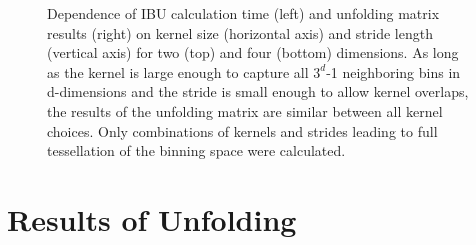    \begin{figure}[ht]
        \centering
    
    
        \caption[Kernel and Stride Dependence of IBU]{Dependence of IBU calculation time (left) and unfolding matrix results (right) on kernel size (horizontal axis) and stride length (vertical axis) for two (top) and four (bottom) dimensions. As long as the kernel is large enough to capture all $3^d$-1 neighboring bins in d-dimensions and the stride is small enough to allow kernel overlaps, the results of the unfolding matrix are similar between all kernel choices. Only combinations of kernels and strides leading to full tessellation of the binning space were calculated. }
        \label{fig:2d-4d-strider-kernel-comp}
    \end{figure}

    
    \clearpage
\section{Results of Unfolding}

